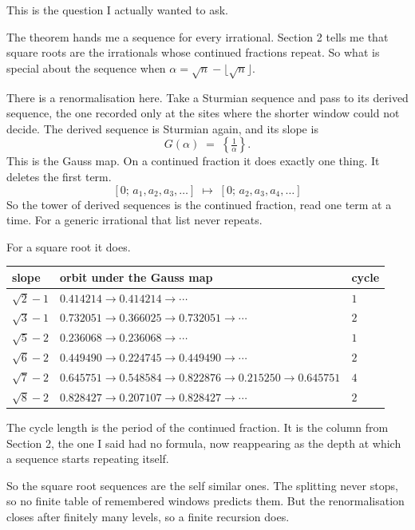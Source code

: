 \documentclass[11pt,a4paper]{article}
\theoremstyle{definition}
\theoremstyle{plain}
\begin{document}
This is the question I actually wanted to ask.

The theorem hands me a sequence for every irrational. Section 2 tells me that
square roots are the irrationals whose continued fractions repeat. So what is
special about the sequence when $\alpha = \sqrt{n} - \lfloor \sqrt{n} \rfloor$.

There is a renormalisation here. Take a Sturmian sequence and pass to its
derived sequence, the one recorded only at the sites where the shorter window
could not decide. The derived sequence is Sturmian again, and its slope is
\[
  G(\alpha) \;=\; \left\{ \tfrac{1}{\alpha} \right\} .
\]
This is the Gauss map. On a continued fraction it does exactly one thing. It
deletes the first term.
\[
  [0;\,a_1,a_2,a_3,\ldots] \;\longmapsto\; [0;\,a_2,a_3,a_4,\ldots]
\]
So the tower of derived sequences is the continued fraction, read one term at a
time. For a generic irrational that list never repeats.

For a square root it does.

\begin{center}
\begin{tabular}{lll}
\toprule
slope & orbit under the Gauss map & cycle \\
\midrule
$\sqrt{2}-1$ & $0.414214 \to 0.414214 \to \cdots$ & $1$ \\
$\sqrt{3}-1$ & $0.732051 \to 0.366025 \to 0.732051 \to \cdots$ & $2$ \\
$\sqrt{5}-2$ & $0.236068 \to 0.236068 \to \cdots$ & $1$ \\
$\sqrt{6}-2$ & $0.449490 \to 0.224745 \to 0.449490 \to \cdots$ & $2$ \\
$\sqrt{7}-2$ & $0.645751 \to 0.548584 \to 0.822876 \to 0.215250 \to 0.645751$ & $4$ \\
$\sqrt{8}-2$ & $0.828427 \to 0.207107 \to 0.828427 \to \cdots$ & $2$ \\
\bottomrule
\end{tabular}
\end{center}

The cycle length is the period of the continued fraction. It is the column from
Section 2, the one I said had no formula, now reappearing as the depth at which
a sequence starts repeating itself.

So the square root sequences are the self similar ones. The splitting never
stops, so no finite table of remembered windows predicts them. But the
renormalisation closes after finitely many levels, so a finite recursion does.
\end{document}
